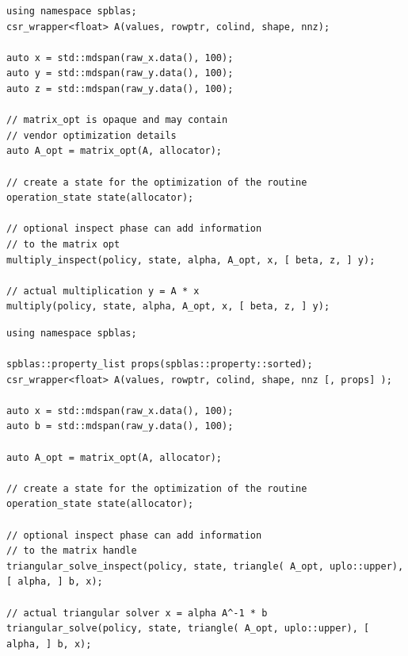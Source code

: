 \documentclass[manuscript,review]{acmart}
\begin{document}
\begin{listing}[h]
\caption{Sparse matrix vector product $y = \alpha \cdot A \cdot x\ [ + \beta \cdot z]$. The arguments $\beta$ and $z$ are optional.}
\label{listing:spmv}
\begin{verbatim}
using namespace spblas;
csr_wrapper<float> A(values, rowptr, colind, shape, nnz);

auto x = std::mdspan(raw_x.data(), 100);
auto y = std::mdspan(raw_y.data(), 100);
auto z = std::mdspan(raw_y.data(), 100);

// matrix_opt is opaque and may contain 
// vendor optimization details
auto A_opt = matrix_opt(A, allocator);

// create a state for the optimization of the routine
operation_state state(allocator);

// optional inspect phase can add information 
// to the matrix opt
multiply_inspect(policy, state, alpha, A_opt, x, [ beta, z, ] y); 

// actual multiplication y = A * x
multiply(policy, state, alpha, A_opt, x, [ beta, z, ] y); 
\end{verbatim}
\end{listing}


\begin{listing}[h]
\caption{Triangular solve: solve $x=\alpha A^{-1} b$. The argument $\alpha$ is optional, the default value for $\alpha$ is $1.0$.}
\label{listing:sptrsv}
\begin{verbatim}
using namespace spblas;

spblas::property_list props(spblas::property::sorted);
csr_wrapper<float> A(values, rowptr, colind, shape, nnz [, props] );

auto x = std::mdspan(raw_x.data(), 100);
auto b = std::mdspan(raw_y.data(), 100);

auto A_opt = matrix_opt(A, allocator);

// create a state for the optimization of the routine
operation_state state(allocator);

// optional inspect phase can add information
// to the matrix handle
triangular_solve_inspect(policy, state, triangle( A_opt, uplo::upper), [ alpha, ] b, x);

// actual triangular solver x = alpha A^-1 * b
triangular_solve(policy, state, triangle( A_opt, uplo::upper), [ alpha, ] b, x);
\end{verbatim}
\end{listing}
\end{document}
